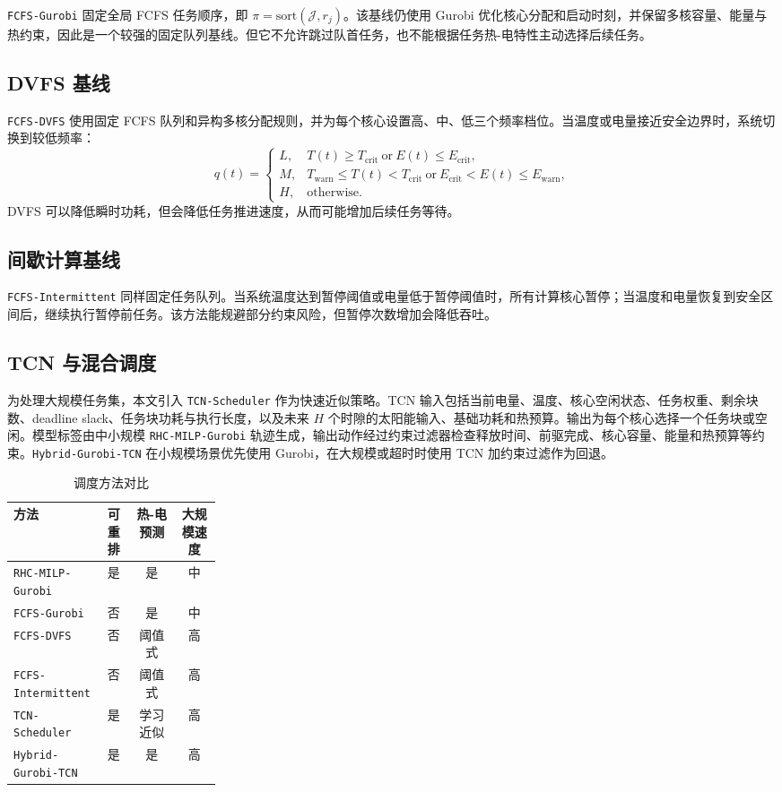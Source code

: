 \documentclass[conference]{IEEEtran}
\newcommand{\rhc}{\texttt{RHC-MILP-Gurobi}}
\newcommand{\fcfsg}{\texttt{FCFS-Gurobi}}
\newcommand{\dvfs}{\texttt{FCFS-DVFS}}
\newcommand{\intermittent}{\texttt{FCFS-Intermittent}}
\newcommand{\tcns}{\texttt{TCN-Scheduler}}
\newcommand{\hybrid}{\texttt{Hybrid-Gurobi-TCN}}
\begin{document}
\fcfsg{} 固定全局 FCFS 任务顺序，即 $\pi=\mathrm{sort}(\mathcal{J},r_j)$。该基线仍使用 Gurobi 优化核心分配和启动时刻，并保留多核容量、能量与热约束，因此是一个较强的固定队列基线。但它不允许跳过队首任务，也不能根据任务热-电特性主动选择后续任务。

\subsection{DVFS 基线}

\dvfs{} 使用固定 FCFS 队列和异构多核分配规则，并为每个核心设置高、中、低三个频率档位。当温度或电量接近安全边界时，系统切换到较低频率：
\begin{equation}
q(t)=
\begin{cases}
L, & T(t)\ge T_{\mathrm{crit}}\ \text{or}\ E(t)\le E_{\mathrm{crit}},\\
M, & T_{\mathrm{warn}}\le T(t)<T_{\mathrm{crit}}\ \text{or}\ E_{\mathrm{crit}}<E(t)\le E_{\mathrm{warn}},\\
H, & \text{otherwise}.
\end{cases}
\end{equation}
DVFS 可以降低瞬时功耗，但会降低任务推进速度，从而可能增加后续任务等待。

\subsection{间歇计算基线}

\intermittent{} 同样固定任务队列。当系统温度达到暂停阈值或电量低于暂停阈值时，所有计算核心暂停；当温度和电量恢复到安全区间后，继续执行暂停前任务。该方法能规避部分约束风险，但暂停次数增加会降低吞吐。

\subsection{TCN 与混合调度}

为处理大规模任务集，本文引入 \tcns{} 作为快速近似策略。TCN 输入包括当前电量、温度、核心空闲状态、任务权重、剩余块数、deadline slack、任务块功耗与执行长度，以及未来 $H$ 个时隙的太阳能输入、基础功耗和热预算。输出为每个核心选择一个任务块或空闲。模型标签由中小规模 \rhc{} 轨迹生成，输出动作经过约束过滤器检查释放时间、前驱完成、核心容量、能量和热预算等约束。\hybrid{} 在小规模场景优先使用 Gurobi，在大规模或超时时使用 TCN 加约束过滤作为回退。

\begin{table}[t]
\centering
\caption{调度方法对比}
\label{tab:method-compare}
\begin{tabular}{p{0.27\linewidth}ccc}
\toprule
方法 & 可重排 & 热-电预测 & 大规模速度 \\
\midrule
\rhc{} & 是 & 是 & 中 \\
\fcfsg{} & 否 & 是 & 中 \\
\dvfs{} & 否 & 阈值式 & 高 \\
\intermittent{} & 否 & 阈值式 & 高 \\
\tcns{} & 是 & 学习近似 & 高 \\
\hybrid{} & 是 & 是 & 高 \\
\bottomrule
\end{tabular}
\end{table}
\end{document}
